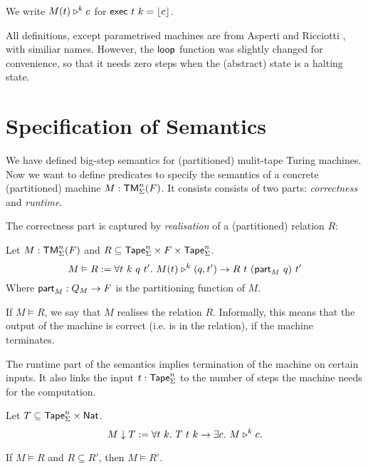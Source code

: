 We write $M(t) \mathrel{\triangleright}^k c$ for $\textsf{exec}~t~k = \left\lfloor {c}\right\rfloor$.

All definitions, except parametrised machines are from Asperti and Ricciotti \cite{asperti2015}, with similiar names.  However, the $\textsf{loop}$
function was slightly changed for convenience, so that it needs zero steps when the (abstract) state is a halting state.

\section{Specification of Semantics}
\label{sec:spec_semantics}

We have defined big-step semantics for (partitioned) mulit-tape Turing machines.  Now we want to define predicates to specify the semantics of a
concrete (partitioned) machine $M: \textsf{TM}_\Sigma^n(F)$.  It consists consists of two parts: \emph{correctness} and \emph{runtime}.

The correctness part is captured by \emph{realisation} of a (partitioned) relation $R$:

\begin{definition}[Realisation]
  \label{def:realisation}
  Let $M:\textsf{TM}_\Sigma^n(F)$ and $R \subseteq \textsf{Tape}_\Sigma^n \times F \times \textsf{Tape}_\Sigma^n$.
  \[
    M \vDash R :=
    \forall t~k~q~t'.~M(t) \mathrel{\triangleright}^k (q, t') \rightarrow
    R~t~(\textsf{part}_M~q)~t'
  \]
  Where $\textsf{part}_M : Q_M \rightarrow F$ is the partitioning function of $M$.
\end{definition}

If $M \vDash R$, we say that $M$ realises the relation $R$.  Informally, this means that the output of the machine is correct (i.e. is in the
relation), if the machine terminates.

The runtime part of the semantics implies termination of the machine on certain inputs.  It also links the input $t:\textsf{Tape}_\Sigma^n$ to the number of
steps the machine needs for the computation.

\begin{definition}
  \label{def:termination}
  Let $T \subseteq \textsf{Tape}_\Sigma^n \times \textsf{Nat}$.
  \[
    M \downarrow T :=
    \forall t~k.~T~t~k \rightarrow
    \exists c.~M \mathrel{\triangleright}^k c.
  \]
\end{definition}


\begin{lemma}
  \label{lem:Realise_monotone}
  If $M \vDash R$ and $R \subseteq R'$, then $M \vDash R'$.
\end{lemma}

